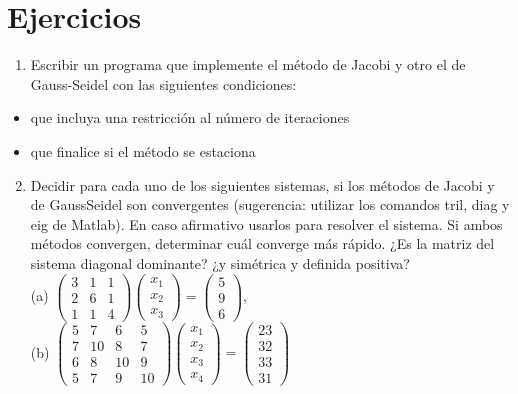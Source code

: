 \documentclass[10pt]{book}
\begin{document}
\section{Ejercicios}
\begin{enumerate}
  \item Escribir un programa que implemente el método de Jacobi y otro el de Gauss-Seidel con las siguientes condiciones:
\end{enumerate}

\begin{itemize}
  \item que incluya una restricción al número de iteraciones
  \item que finalice si el método se estaciona
\end{itemize}

\begin{enumerate}
  \setcounter{enumi}{1}
  \item Decidir para cada uno de los siguientes sistemas, si los métodos de Jacobi y de GaussSeidel son convergentes (sugerencia: utilizar los comandos tril, diag y eig de Matlab). En caso afirmativo usarlos para resolver el sistema. Si ambos métodos convergen, determinar cuál converge más rápido. ¿Es la matriz del sistema diagonal dominante? ¿y simétrica y definida positiva?\\
(a) $\left(\begin{array}{lll}3 & 1 & 1 \\ 2 & 6 & 1 \\ 1 & 1 & 4\end{array}\right)\left(\begin{array}{l}x_{1} \\ x_{2} \\ x_{3}\end{array}\right)=\left(\begin{array}{l}5 \\ 9 \\ 6\end{array}\right)$,\\
(b) $\left(\begin{array}{cccc}5 & 7 & 6 & 5 \\ 7 & 10 & 8 & 7 \\ 6 & 8 & 10 & 9 \\ 5 & 7 & 9 & 10\end{array}\right)\left(\begin{array}{l}x_{1} \\ x_{2} \\ x_{3} \\ x_{4}\end{array}\right)=\left(\begin{array}{l}23 \\ 32 \\ 33 \\ 31\end{array}\right)$

\end{enumerate}
\end{document}
